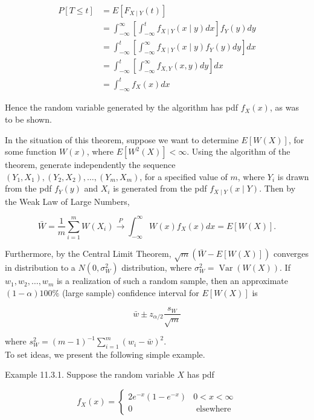 $$
\begin{aligned}
P[T \leq t] & =E\left[F_{X \mid Y}(t)\right] \\
& =\int_{-\infty}^{\infty}\left[\int_{-\infty}^{t} f_{X \mid Y}(x \mid y) d x\right] f_{Y}(y) d y \\
& =\int_{-\infty}^{t}\left[\int_{-\infty}^{\infty} f_{X \mid Y}(x \mid y) f_{Y}(y) d y\right] d x \\
& =\int_{-\infty}^{t}\left[\int_{-\infty}^{\infty} f_{X, Y}(x, y) d y\right] d x \\
& =\int_{-\infty}^{t} f_{X}(x) d x
\end{aligned}
$$

Hence the random variable generated by the algorithm has pdf $f_{X}(x)$, as was to be shown.

In the situation of this theorem, suppose we want to determine $E[W(X)]$, for some function $W(x)$, where $E\left[W^{2}(X)\right]<\infty$. Using the algorithm of the theorem, generate independently the sequence $\left(Y_{1}, X_{1}\right),\left(Y_{2}, X_{2}\right), \ldots,\left(Y_{m}, X_{m}\right)$, for a specified value of $m$, where $Y_{i}$ is drawn from the pdf $f_{Y}(y)$ and $X_{i}$ is generated from the pdf $f_{X \mid Y}(x \mid Y)$. Then by the Weak Law of Large Numbers,

$$
\bar{W}=\frac{1}{m} \sum_{i=1}^{m} W\left(X_{i}\right) \xrightarrow{P} \int_{-\infty}^{\infty} W(x) f_{X}(x) d x=E[W(X)] .
$$

Furthermore, by the Central Limit Theorem, $\sqrt{m}(\bar{W}-E[W(X)])$ converges in distribution to a $N\left(0, \sigma_{W}^{2}\right)$ distribution, where $\sigma_{W}^{2}=\operatorname{Var}(W(X))$. If $w_{1}, w_{2}, \ldots, w_{m}$ is a realization of such a random sample, then an approximate $(1-\alpha) 100 \%$ (large sample) confidence interval for $E[W(X)]$ is


\begin{equation*}
\bar{w} \pm z_{\alpha / 2} \frac{s_{W}}{\sqrt{m}} \tag{11.3.4}
\end{equation*}


where $s_{W}^{2}=(m-1)^{-1} \sum_{i=1}^{m}\left(w_{i}-\bar{w}\right)^{2}$.\\
To set ideas, we present the following simple example.

Example 11.3.1. Suppose the random variable $X$ has pdf

\[
f_{X}(x)= \begin{cases}2 e^{-x}\left(1-e^{-x}\right) & 0<x<\infty  \tag{11.3.5}\\ 0 & \text { elsewhere }\end{cases}
\]

